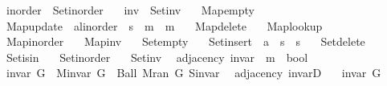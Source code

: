\begin{isabellebody}
\ \ inorder\ {\isacharequal}{\kern0pt}\ Set{\isacharunderscore}{\kern0pt}inorder\ \isanewline
\ \ inv\ {\isacharequal}{\kern0pt}\ Set{\isacharunderscore}{\kern0pt}inv\ \isanewline
\ \ Map{\isacharunderscore}{\kern0pt}empty\ \isanewline
\ \ Map{\isacharunderscore}{\kern0pt}update\ {\isacharcolon}{\kern0pt}{\isacharcolon}{\kern0pt}\ {\isachardoublequoteopen}{\isacharprime}{\kern0pt}a{\isacharcolon}{\kern0pt}{\isacharcolon}{\kern0pt}linorder\ {\isasymRightarrow}\ {\isacharprime}{\kern0pt}s\ {\isasymRightarrow}\ {\isacharprime}{\kern0pt}m\ {\isasymRightarrow}\ {\isacharprime}{\kern0pt}m{\isachardoublequoteclose}\ \isanewline
\ \ Map{\isacharunderscore}{\kern0pt}delete\ \isanewline
\ \ Map{\isacharunderscore}{\kern0pt}lookup\ \isanewline
\ \ Map{\isacharunderscore}{\kern0pt}inorder\ \isanewline
\ \ Map{\isacharunderscore}{\kern0pt}inv\ \isanewline
\ \ Set{\isacharunderscore}{\kern0pt}empty\ \isanewline
\ \ Set{\isacharunderscore}{\kern0pt}insert\ {\isacharcolon}{\kern0pt}{\isacharcolon}{\kern0pt}\ {\isachardoublequoteopen}{\isacharprime}{\kern0pt}a\ {\isasymRightarrow}\ {\isacharprime}{\kern0pt}s\ {\isasymRightarrow}\ {\isacharprime}{\kern0pt}s{\isachardoublequoteclose}\ \isanewline
\ \ Set{\isacharunderscore}{\kern0pt}delete\ \isanewline
\ \ Set{\isacharunderscore}{\kern0pt}isin\ \isanewline
\ \ Set{\isacharunderscore}{\kern0pt}inorder\ \isanewline
\ \ Set{\isacharunderscore}{\kern0pt}inv\isanewline
\isanewline
{}\isamarkupfalse%
\ {\isacharparenleft}{\kern0pt}\ adjacency{\isacharparenright}{\kern0pt}\ invar\ {\isacharcolon}{\kern0pt}{\isacharcolon}{\kern0pt}\ {\isachardoublequoteopen}{\isacharprime}{\kern0pt}m\ {\isasymRightarrow}\ bool{\isachardoublequoteclose}\ \isanewline
\ \ {\isachardoublequoteopen}invar\ G\ {\isasymequiv}\ M{\isachardot}{\kern0pt}invar\ G\ {\isasymand}\ Ball\ {\isacharparenleft}{\kern0pt}M{\isachardot}{\kern0pt}ran\ G{\isacharparenright}{\kern0pt}\ S{\isachardot}{\kern0pt}invar{\isachardoublequoteclose}\isanewline
%
\isadeliminvisible
\isanewline
%
\endisadeliminvisible
%
\isataginvisible
{}\isamarkupfalse%
\ {\isacharparenleft}{\kern0pt}\ adjacency{\isacharparenright}{\kern0pt}\ invarD{\isacharcolon}{\kern0pt}\isanewline
\ \ \ {\isachardoublequoteopen}invar\ G{\isachardoublequoteclose}\isanewline
\ \ \isanewline

\end{isabellebody}
